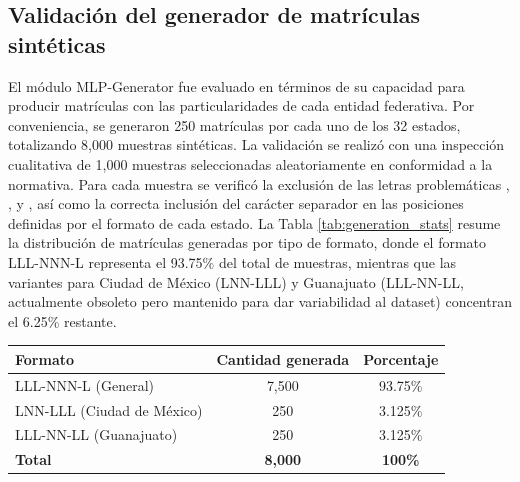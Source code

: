 \subsection*{Validación del generador de matrículas sintéticas}
El módulo MLP-Generator fue evaluado en términos de su capacidad para producir matrículas con las particularidades de cada entidad federativa. Por conveniencia, se generaron 250 matrículas por cada uno de los 32 estados, totalizando 8,000 muestras sintéticas. La validación se realizó con una inspección cualitativa de 1,000 muestras seleccionadas aleatoriamente en conformidad a la normativa. Para cada muestra se verificó la exclusión de las letras problemáticas , ,  y , así como la correcta inclusión del carácter separador \quotes{-} en las posiciones definidas por el formato de cada estado. La Tabla \ref{tab:generation_stats} resume la distribución de matrículas generadas por tipo de formato, donde el formato LLL-NNN-L representa el 93.75\% del total de muestras, mientras que las variantes para Ciudad de México (LNN-LLL) y Guanajuato (LLL-NN-LL, actualmente obsoleto pero mantenido para dar variabilidad al dataset) concentran el 6.25\% restante.

\sffamily
\footnotesize
{}
\begin{center}
\begin{tcolorbox}[
colback=white,
colframe=MASA-Blue,
title={Tabla~\thetable~Distribución de matrículas generadas por tipo de formato},
boxrule=0.5mm,
arc=2mm,
width=12cm,
enhanced,
fonttitle=\bfseries,
before upper=\vspace{2mm},
after upper=\vspace{2mm}
]
\label{tab:generation_stats}
\renewcommand{\arraystretch}{1.5}
\begin{tabularx}{\textwidth}{@{}l c c@{}}
\textbf{Formato} & \textbf{Cantidad generada} & \textbf{Porcentaje} \\
\midrule
LLL-NNN-L (General) & 7,500 & 93.75\% \\
LNN-LLL (Ciudad de México) & 250 & 3.125\% \\
LLL-NN-LL (Guanajuato) & 250 & 3.125\% \\
\midrule
\textbf{Total} & \textbf{8,000} & \textbf{100\%} \\
\end{tabularx}
\end{tcolorbox}
\end{center}
\normalsize
\normalfont

